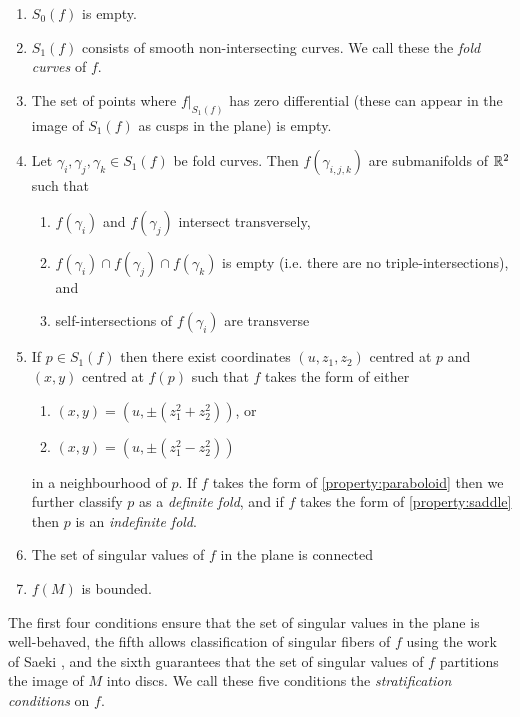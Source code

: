 \begin{enumerate}
	\item $S_0(f)$ is empty.
	
	\item $S_1(f)$ consists of smooth non-intersecting curves.  We call these the \emph{fold curves} of $f$.
	
	\item The set of points where $f|_{S_1(f)}$ has zero differential (these can appear in the image of $S_1(f)$ as cusps in the plane) is empty.
	
	\item Let $\gamma_i, \gamma_j, \gamma_k \in S_1(f)$ be fold curves. Then $f(\gamma_{i,j,k})$ are submanifolds of $\mathbb{R}^2$ such that
	\begin{enumerate}
		\item $f(\gamma_i)$ and $f(\gamma_j)$ intersect transversely,
		
		\item $f(\gamma_i)\cap f(\gamma_j)\cap f(\gamma_k)$ is empty (i.e. there are no triple-intersections), and
		
		\item self-intersections of $f(\gamma_i)$ are transverse
	\end{enumerate}
	
	\item If $p\in S_1(f)$ then there exist coordinates $(u, z_1, z_2)$ centred at $p$ and $(x,y)$ centred at $f(p)$ such that $f$ takes the form of either
	\begin{enumerate}
		\item\label{property:paraboloid} $(x,y)=(u,\pm(z_1^2+z_2^2))$, or
		\item\label{property:saddle} $(x,y)=(u,\pm(z_1^2-z_2^2))$
	\end{enumerate}
	in a neighbourhood of $p$.
	If $f$ takes the form of \ref{property:paraboloid} then we further classify $p$ as a \emph{definite fold}, and if $f$ takes the form of \ref{property:saddle} then $p$ is an \emph{indefinite fold}.
	
	\item The set of singular values of $f$ in the plane is connected
	
	\item $f(M)$ is bounded.
\end{enumerate}

The first four conditions ensure that the set of singular values in the plane is well-behaved, the fifth allows classification of singular fibers of $f$ using the work of Saeki \cite{Saeki}, and the sixth guarantees that the set of singular values of $f$ partitions the image of $M$ into discs.
We call these five conditions the \emph{stratification conditions} on $f$.